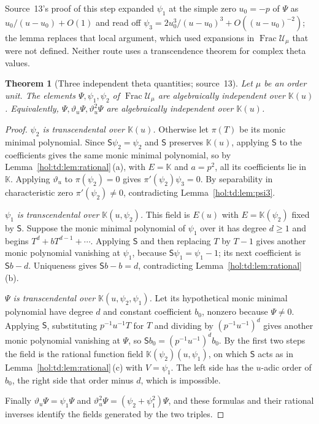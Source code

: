 \documentclass[11pt]{article}
\numberwithin{equation}{section}
\newtheorem{theorem}{Theorem}[section]
\theoremstyle{definition}
\theoremstyle{remark}
\newcommand{\KK}{\mathbb K}
\begin{document}
Source~13's proof of this step expanded $\psi_1$ at the simple zero
$u_0=-p$ of $\Psi$ as $u_0/(u-u_0)+O(1)$ and read off
$\psi_3=2u_0^3/(u-u_0)^3+O((u-u_0)^{-2})$; the lemma replaces that local
argument, which used expansions in $\operatorname{Frac}\mathcal U_\mu$ that
were not defined. Neither route uses a transcendence theorem for complex theta
values.

\begin{theorem}[Three independent theta quantities; source~13]
\label{hol:td:thm:independent}
Let $\mu$ be an order unit. The elements $\Psi,\psi_1,\psi_2$ of
$\operatorname{Frac}\mathcal U_\mu$ are algebraically independent over
$\KK(u)$. Equivalently, $\Psi,\vartheta_u\Psi,\vartheta_u^2\Psi$ are
algebraically independent over $\KK(u)$.
\end{theorem}

\begin{proof}
\emph{$\psi_2$ is transcendental over $\KK(u)$.} Otherwise let $\pi(T)$ be its
monic minimal polynomial. Since $\mathsf S\psi_2=\psi_2$ and $\mathsf S$
preserves $\KK(u)$, applying $\mathsf S$ to the coefficients gives the same
monic minimal polynomial, so by Lemma~\ref{hol:td:lem:rational}\,(a), with
$E=\KK$ and $a=p^2$, all its coefficients lie in $\KK$. Applying $\vartheta_u$
to $\pi(\psi_2)=0$ gives $\pi'(\psi_2)\psi_3=0$. By separability in
characteristic zero $\pi'(\psi_2)\ne0$, contradicting
Lemma~\ref{hol:td:lem:psi3}.

\emph{$\psi_1$ is transcendental over $\KK(u,\psi_2)$.} This field is $E(u)$
with $E=\KK(\psi_2)$ fixed by $\mathsf S$. Suppose the monic minimal polynomial
of $\psi_1$ over it has degree $d\ge1$ and begins $T^d+bT^{d-1}+\cdots$.
Applying $\mathsf S$ and then replacing $T$ by $T-1$ gives another monic
polynomial vanishing at $\psi_1$, because $\mathsf S\psi_1=\psi_1-1$; its next
coefficient is $\mathsf Sb-d$. Uniqueness gives $\mathsf Sb-b=d$, contradicting
Lemma~\ref{hol:td:lem:rational}\,(b).

\emph{$\Psi$ is transcendental over $\KK(u,\psi_2,\psi_1)$.} Let its
hypothetical monic minimal polynomial have degree $d$ and constant coefficient
$b_0$, nonzero because $\Psi\ne0$. Applying $\mathsf S$, substituting
$p^{-1}u^{-1}T$ for $T$ and dividing by $(p^{-1}u^{-1})^d$ gives another monic
polynomial vanishing at $\Psi$, so $\mathsf Sb_0=(p^{-1}u^{-1})^db_0$. By the
first two steps the field is the rational function field
$\KK(\psi_2)(u,\psi_1)$, on which $\mathsf S$ acts as in
Lemma~\ref{hol:td:lem:rational}\,(c) with $V=\psi_1$. The left side has the
$u$-adic order of $b_0$, the right side that order minus $d$, which is
impossible.

Finally $\vartheta_u\Psi=\psi_1\Psi$ and
$\vartheta_u^2\Psi=(\psi_2+\psi_1^2)\Psi$, and these formulas and their
rational inverses identify the fields generated by the two triples.
\end{proof}
\end{document}
